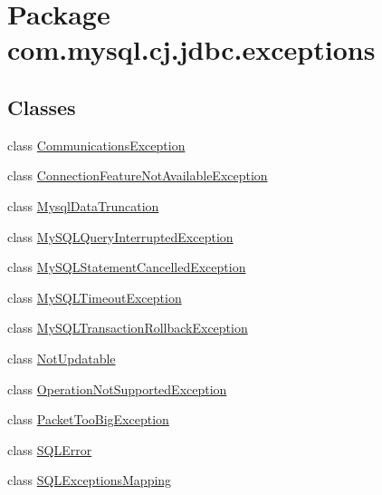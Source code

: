 \hypertarget{namespacecom_1_1mysql_1_1cj_1_1jdbc_1_1exceptions}{}\section{Package com.\+mysql.\+cj.\+jdbc.\+exceptions}
\label{namespacecom_1_1mysql_1_1cj_1_1jdbc_1_1exceptions}
\subsection*{Classes}
\begin{DoxyCompactItemize}
\item 
class \mbox{\hyperlink{classcom_1_1mysql_1_1cj_1_1jdbc_1_1exceptions_1_1_communications_exception}{Communications\+Exception}}
\item 
class \mbox{\hyperlink{classcom_1_1mysql_1_1cj_1_1jdbc_1_1exceptions_1_1_connection_feature_not_available_exception}{Connection\+Feature\+Not\+Available\+Exception}}
\item 
class \mbox{\hyperlink{classcom_1_1mysql_1_1cj_1_1jdbc_1_1exceptions_1_1_mysql_data_truncation}{Mysql\+Data\+Truncation}}
\item 
class \mbox{\hyperlink{classcom_1_1mysql_1_1cj_1_1jdbc_1_1exceptions_1_1_my_s_q_l_query_interrupted_exception}{My\+S\+Q\+L\+Query\+Interrupted\+Exception}}
\item 
class \mbox{\hyperlink{classcom_1_1mysql_1_1cj_1_1jdbc_1_1exceptions_1_1_my_s_q_l_statement_cancelled_exception}{My\+S\+Q\+L\+Statement\+Cancelled\+Exception}}
\item 
class \mbox{\hyperlink{classcom_1_1mysql_1_1cj_1_1jdbc_1_1exceptions_1_1_my_s_q_l_timeout_exception}{My\+S\+Q\+L\+Timeout\+Exception}}
\item 
class \mbox{\hyperlink{classcom_1_1mysql_1_1cj_1_1jdbc_1_1exceptions_1_1_my_s_q_l_transaction_rollback_exception}{My\+S\+Q\+L\+Transaction\+Rollback\+Exception}}
\item 
class \mbox{\hyperlink{classcom_1_1mysql_1_1cj_1_1jdbc_1_1exceptions_1_1_not_updatable}{Not\+Updatable}}
\item 
class \mbox{\hyperlink{classcom_1_1mysql_1_1cj_1_1jdbc_1_1exceptions_1_1_operation_not_supported_exception}{Operation\+Not\+Supported\+Exception}}
\item 
class \mbox{\hyperlink{classcom_1_1mysql_1_1cj_1_1jdbc_1_1exceptions_1_1_packet_too_big_exception}{Packet\+Too\+Big\+Exception}}
\item 
class \mbox{\hyperlink{classcom_1_1mysql_1_1cj_1_1jdbc_1_1exceptions_1_1_s_q_l_error}{S\+Q\+L\+Error}}
\item 
class \mbox{\hyperlink{classcom_1_1mysql_1_1cj_1_1jdbc_1_1exceptions_1_1_s_q_l_exceptions_mapping}{S\+Q\+L\+Exceptions\+Mapping}}
\end{DoxyCompactItemize}
